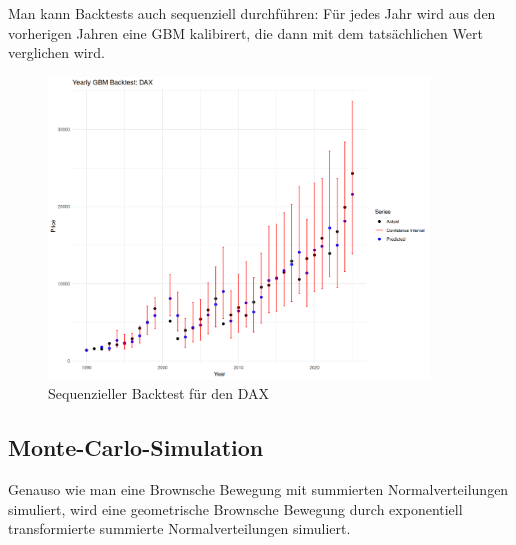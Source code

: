 \begin{bsp}
Man kann Backtests auch sequenziell durchführen: Für jedes Jahr wird aus den vorherigen Jahren eine GBM kalibirert, die dann mit dem tatsächlichen Wert verglichen wird.

\begin{figure}[H]
    \centering
    \includegraphics[width=0.9\textwidth]{images/dax_backtest_seq.png}
    \caption{Sequenzieller Backtest für den DAX}
    \label{fig:dax_backtest_seq}
\end{figure}

\end{bsp}

\subsection{Monte-Carlo-Simulation}

Genauso wie man eine Brownsche Bewegung mit summierten Normalverteilungen simuliert, 
wird eine geometrische Brownsche Bewegung durch exponentiell transformierte
summierte Normalverteilungen simuliert. 


